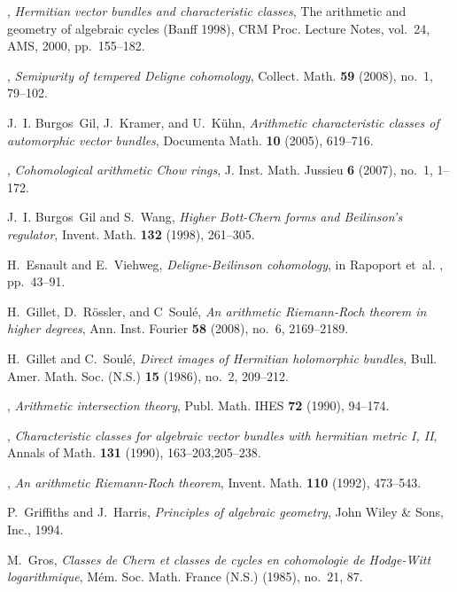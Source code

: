 \documentclass[10pt,twoside]{article}
\numberwithin{equation}{section}
\theoremstyle{plain}
\theoremstyle{definition}
\begin{document}
\begin{thebibliography}{10}
\bysame, \emph{Hermitian vector bundles and characteristic classes}, The
  arithmetic and geometry of algebraic cycles (Banff 1998), CRM Proc. Lecture
  Notes, vol.~24, AMS, 2000, pp.~155--182.

\bysame, \emph{Semipurity of tempered {D}eligne cohomology}, Collect. Math.
  \textbf{59} (2008), no.~1, 79--102. 

J.~I. Burgos~Gil, J.~Kramer, and U.~K\"uhn, \emph{Arithmetic characteristic
  classes of automorphic vector bundles}, Documenta Math. \textbf{10} (2005),
  619--716.

\bysame, \emph{Cohomological arithmetic {C}how rings}, J. Inst. Math. Jussieu
  \textbf{6} (2007), no.~1, 1--172. 

J.~I. Burgos~Gil and S.~Wang, \emph{Higher {B}ott-{C}hern forms and
  {B}eilinson's regulator}, Invent. Math. \textbf{132} (1998), 261--305.

H.~Esnault and E.~Viehweg, \emph{{D}eligne-{B}eilinson cohomology}, in Rapoport
  et~al. \cite{Rapoport:csvlf}, pp.~43--91.

H.~Gillet, D.~R\"ossler, and C~Soul\'e, \emph{An arithmetic {R}iemann-{R}och
  theorem in higher degrees}, Ann. Inst. Fourier \textbf{58} (2008), no.~6,
  2169--2189.

H.~Gillet and C.~Soul{\'e}, \emph{Direct images of {H}ermitian holomorphic
  bundles}, Bull. Amer. Math. Soc. (N.S.) \textbf{15} (1986), no.~2, 209--212.

\bysame, \emph{Arithmetic intersection theory}, Publ. Math. IHES \textbf{72}
  (1990), 94--174.

\bysame, \emph{Characteristic classes for algebraic vector bundles with
  hermitian metric {I}, {II}}, Annals of Math. \textbf{131} (1990),
  163--203,205--238.

\bysame, \emph{An arithmetic {R}iemann-{R}och theorem}, Invent. Math.
  \textbf{110} (1992), 473--543.

P.~Griffiths and J.~Harris, \emph{Principles of algebraic geometry}, John Wiley
  {\&} Sons, Inc., 1994.

M.~Gros, \emph{Classes de {C}hern et classes de cycles en cohomologie de
  {H}odge-{W}itt logarithmique}, M\'em. Soc. Math. France (N.S.) (1985),
  no.~21, 87. 


\end{thebibliography}
\end{document}
